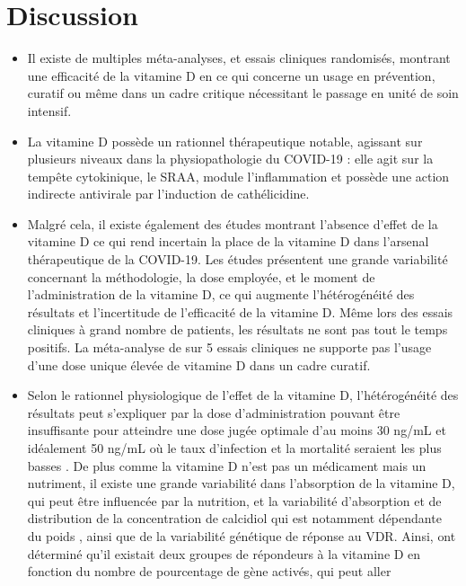 \documentclass[
  a4paper,
  DIV=11,
  numbers=noendperiod,
  listof=totoc]{scrreprt}
\begin{document}
\section{Discussion}\label{discussion}

\begin{itemize}
\item
  Il existe de multiples méta-analyses, et essais cliniques randomisés,
  montrant une efficacité de la vitamine D en ce qui concerne un usage
  en prévention, curatif ou même dans un cadre critique nécessitant le
  passage en unité de soin intensif.
\item
  La vitamine D possède un rationnel thérapeutique notable, agissant sur
  plusieurs niveaux dans la physiopathologie du COVID-19 : elle agit sur
  la tempête cytokinique, le SRAA, module l'inflammation et possède une
  action indirecte antivirale par l'induction de cathélicidine.
\item
  Malgré cela, il existe également des études montrant l'absence d'effet
  de la vitamine D ce qui rend incertain la place de la vitamine D dans
  l'arsenal thérapeutique de la COVID-19. Les études présentent une
  grande variabilité concernant la méthodologie, la dose employée, et le
  moment de l'administration de la vitamine D, ce qui augmente
  l'hétérogénéité des résultats et l'incertitude de l'efficacité de la
  vitamine D. Même lors des essais cliniques à grand nombre de patients,
  les résultats ne sont pas tout le temps positifs. La méta-analyse de
  \textcite{Zhong.2024} sur 5 essais cliniques ne supporte pas l'usage
  d'une dose unique élevée de vitamine D dans un cadre curatif.
\item
  Selon le rationnel physiologique de l'effet de la vitamine D,
  l'hétérogénéité des résultats peut s'expliquer par la dose
  d'administration pouvant être insuffisante pour atteindre une dose
  jugée optimale d'au moins 30 ng/mL et idéalement 50 ng/mL où le taux
  d'infection et la mortalité seraient les plus basses
  \autocites{Wimalawansa.2022}[ ]{Kaufman.2020}{Borsche.2021}. De plus
  comme la vitamine D n'est pas un médicament mais un nutriment, il
  existe une grande variabilité dans l'absorption de la vitamine D, qui
  peut être influencée par la nutrition, et la variabilité d'absorption
  et de distribution de la concentration de calcidiol qui est notamment
  dépendante du poids \autocite{Ekwaru.2014}, ainsi que de la
  variabilité génétique de réponse au VDR. Ainsi, \textcite{Vukić.2015}
  ont déterminé qu'il existait deux groupes de répondeurs à la vitamine
  D en fonction du nombre de pourcentage de gène activés, qui peut aller

\end{itemize}
\end{document}
